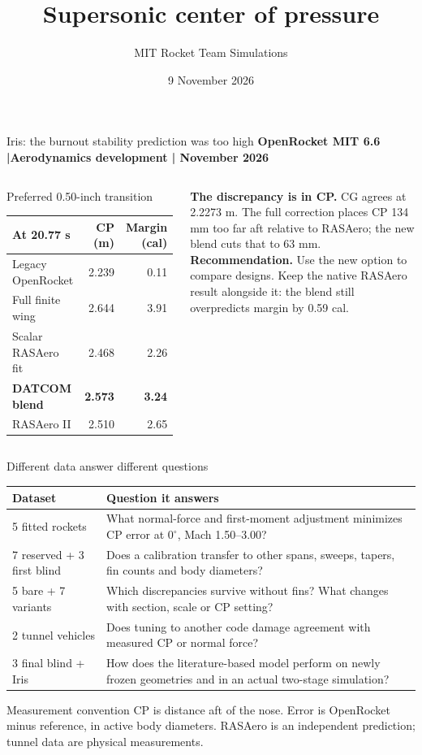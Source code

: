 \documentclass[aspectratio=169,10pt]{beamer}
\title{Supersonic center of pressure}\author{MIT Rocket Team Simulations}\date{9 November 2026}
\begin{document}
\begin{frame}{Iris: the burnout stability prediction was too high}
{\small\color{cernblue}\textbf{OpenRocket MIT 6.6 \enspace|\enspace Aerodynamics development \enspace| November 2026}}
\begin{columns}[T,onlytextwidth]
\begin{block}{Preferred 0.50-inch transition}
\centering\small\begin{tabular}{lrr}\toprule
At 20.77 s & CP (m) & Margin (cal)\\\midrule
Legacy OpenRocket & 2.239 & 0.11\\
Full finite wing & 2.644 & 3.91\\
Scalar RASAero fit & 2.468 & 2.26\\
\textbf{DATCOM blend} & \textbf{2.573} & \textbf{3.24}\\
RASAero II & 2.510 & 2.65\\\bottomrule\end{tabular}
\end{block}
\small\textbf{The discrepancy is in CP.} CG agrees at 2.2273 m. The full correction places CP 134 mm too far aft relative to RASAero; the new blend cuts that to 63 mm.\\[.7em]
\textbf{Recommendation.} Use the new option to compare designs. Keep the native RASAero result alongside it: the blend still overpredicts margin by 0.59 cal.
\end{columns}
\end{frame}
\begin{frame}{Different data answer different questions}
\small\begin{tabular}{p{.22\linewidth}p{.67\linewidth}}\toprule
\textbf{Dataset} & \textbf{Question it answers}\\\midrule
5 fitted rockets & What normal-force and first-moment adjustment minimizes CP error at $0^\circ$, Mach 1.50--3.00?\\[.4em]
7 reserved + 3 first blind & Does a calibration transfer to other spans, sweeps, tapers, fin counts and body diameters?\\[.4em]
5 bare + 7 variants & Which discrepancies survive without fins? What changes with section, scale or CP setting?\\[.4em]
2 tunnel vehicles & Does tuning to another code damage agreement with measured CP or normal force?\\[.4em]
3 final blind + Iris & How does the literature-based model perform on newly frozen geometries and in an actual two-stage simulation?\\\bottomrule\end{tabular}
\vspace{.6em}
\begin{block}{Measurement convention}
CP is distance aft of the nose. Error is OpenRocket minus reference, in active body diameters. RASAero is an independent prediction; tunnel data are physical measurements.
\end{block}
\end{frame}
\end{document}
